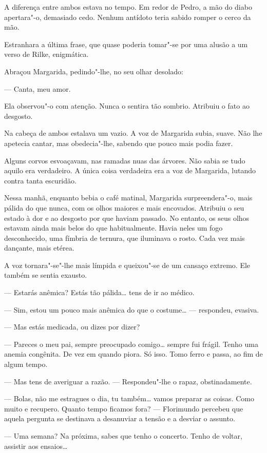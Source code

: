 A diferença entre ambos estava no tempo. Em redor de Pedro, a mão do
diabo apertara"-o, demasiado cedo. Nenhum antídoto teria sabido romper o
cerco da mão.

Estranhara a última frase, que quase poderia tomar"-se por uma alusão a
um verso de Rilke, enigmática.

Abraçou Margarida, pedindo"-lhe, no seu olhar desolado:

--- Canta, meu amor.

Ela observou"-o com atenção. Nunca o sentira tão sombrio. Atribuiu o
fato ao desgosto.

Na cabeça de ambos estalava um vazio. A voz de Margarida subia, suave.
Não lhe apetecia cantar, mas obedecia"-lhe, sabendo que pouco mais podia
fazer.

Alguns corvos esvoaçavam, nas ramadas nuas das árvores. Não sabia se
tudo aquilo era verdadeiro. A única coisa verdadeira era a voz de
Margarida, lutando contra tanta escuridão.

Nessa manhã, enquanto bebia o café matinal, Margarida surpreendera"-o,
mais pálida do que nunca, com os olhos maiores e mais encovados.
Atribuiu o seu estado à dor e ao desgosto por que haviam passado. No
entanto, os seus olhos estavam ainda mais belos do que habitualmente.
Havia neles um fogo desconhecido, uma fímbria de ternura, que iluminava
o rosto. Cada vez mais dançante, mais etérea.

A voz tornara"-se"-lhe mais límpida e queixou"-se de um cansaço extremo.
Ele também se sentia exausto.

--- Estarás anêmica? Estás tão pálida\ldots{} tens de ir ao médico.

--- Sim, estou um pouco mais anêmica do que o costume\ldots{} --- respondeu,
evasiva.

--- Mas estás medicada, ou dizes por dizer?

--- Pareces o meu pai, sempre preocupado comigo\ldots{} sempre fui frágil.
Tenho uma anemia congênita. De vez em quando piora. Só isso. Tomo ferro
e passa, ao fim de algum tempo.

--- Mas tens de averiguar a razão. ---  Respondeu"-lhe o rapaz,
obstinadamente.

--- Bolas, não me estragues o dia, tu também\ldots{} vamos preparar as coisas.
Como muito e recupero. Quanto tempo ficamos fora? ---  Florimundo percebeu
que aquela pergunta se destinava a desanuviar a tensão e a desviar o
assunto.

--- Uma semana? Na próxima, sabes que tenho o concerto. Tenho de voltar,
assistir aos ensaios\ldots{}

